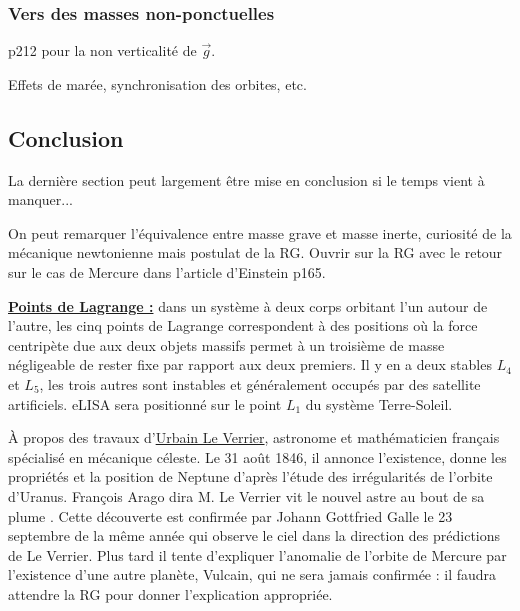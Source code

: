 \subsubsection{Vers des masses non-ponctuelles}

\cite{Sanz2016} p212 pour la non verticalité de $\overrightarrow{g}$.

Effets de marée, synchronisation des orbites, etc.

\subsection*{Conclusion}

La dernière section peut largement être mise en conclusion si le temps vient à manquer...

On peut remarquer l'équivalence entre masse grave et masse inerte, curiosité de la mécanique newtonienne mais postulat de la RG.
Ouvrir sur la RG avec le retour sur le cas de Mercure dans l'article d'Einstein \cite{Faroux1996} p165.

\begin{remarque}
\href{https://fr.wikipedia.org/wiki/Point_de_Lagrange}{\textbf{Points de Lagrange :}} dans un système à deux corps orbitant l'un autour de l'autre, les cinq points de Lagrange correspondent à des positions où la force centripète due aux deux objets massifs permet à un troisième de masse négligeable de rester fixe par rapport aux deux premiers.
Il y en a deux stables $L_4$ et $L_5$, les trois autres sont instables et généralement occupés par des satellite artificiels.
eLISA sera positionné sur le point $L_1$ du système Terre-Soleil.
\end{remarque}

\begin{funfact}
À propos des travaux d'\href{https://fr.wikipedia.org/wiki/Urbain_Le_Verrier}{Urbain Le Verrier}, astronome et mathématicien français spécialisé en mécanique céleste.
Le 31 août 1846, il annonce l'existence, donne les propriétés et la position de Neptune d'après l'étude des irrégularités de l'orbite d'Uranus.
François Arago dira \og M. Le Verrier vit le nouvel astre au bout de sa plume \fg{}. 
Cette découverte est confirmée par Johann Gottfried Galle le 23 septembre de la même année qui observe le ciel dans la direction des prédictions de Le Verrier.
Plus tard il tente d'expliquer l'anomalie de l'orbite de Mercure par l'existence d'une autre planète, Vulcain, qui ne sera jamais confirmée : il faudra attendre la RG pour donner l'explication appropriée.
\end{funfact}

\newpage